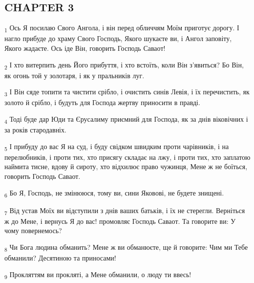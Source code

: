 \subsection{CHAPTER 3}
\begin{tcolorbox}
\textsubscript{1} Ось Я посилаю Свого Ангола, і він перед обличчям Моїм приготує дорогу. І нагло прибуде до храму Свого Господь, Якого шукаєте ви, і Ангол заповіту, Якого жадаєте. Ось іде Він, говорить Господь Саваот!
\end{tcolorbox}
\begin{tcolorbox}
\textsubscript{2} І хто витерпить день Його прибуття, і хто встоїть, коли Він з'явиться? Бо Він, як огонь той у золотаря, і як у пральників луг.
\end{tcolorbox}
\begin{tcolorbox}
\textsubscript{3} І Він сяде топити та чистити срібло, і очистить синів Левія, і їх перечистить, як золото й срібло, і будуть для Господа жертву приносити в правді.
\end{tcolorbox}
\begin{tcolorbox}
\textsubscript{4} Тоді буде дар Юди та Єрусалиму приємний для Господа, як за днів віковічних і за років стародавніх.
\end{tcolorbox}
\begin{tcolorbox}
\textsubscript{5} І прибуду до вас Я на суд, і буду свідком швидким проти чарівників, і на перелюбників, і проти тих, хто присягу складає на лжу, і проти тих, хто заплатою наймита тисне, вдову й сироту, хто відхилює право чужинця, Мене ж не боїться, говорить Господь Саваот.
\end{tcolorbox}
\begin{tcolorbox}
\textsubscript{6} Бо Я, Господь, не змінююся, тому ви, сини Яковові, не будете знищені.
\end{tcolorbox}
\begin{tcolorbox}
\textsubscript{7} Від устав Моїх ви відступили з днів ваших батьків, і їх не стерегли. Верніться ж до Мене, і вернусь Я до вас! промовляє Господь Саваот. Та говорите ви: У чому повернемось?
\end{tcolorbox}
\begin{tcolorbox}
\textsubscript{8} Чи Бога людина обманить? Мене ж ви обманюєте, ще й говорите: Чим ми Тебе обманили? Десятиною та приносами!
\end{tcolorbox}
\begin{tcolorbox}
\textsubscript{9} Прокляттям ви прокляті, а Мене обманили, о люду ти ввесь!
\end{tcolorbox}
